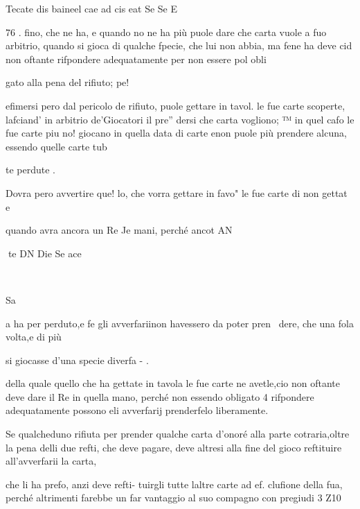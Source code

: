 \documentclass[12pt,a6paper]{article}
\begin{document}
 

Tecate dis baineel cae ad cis eat Se Se E

 

 
 

 

 

 

 

76 .
fino, che ne ha, e quando no
ne ha più puole dare che carta
vuole a fuo arbitrio, quando si
gioca di qualche fpecie, che lui
non abbia, ma fene ha deve cid
non oftante rifpondere adequatamente per non essere pol obli

gato alla pena del rifiuto; pe!

efimersi pero dal pericolo de
rifiuto, puole gettare in tavol.
le fue carte scoperte, lafciand'
in arbitrio de’Giocatori il pre”
dersi che carta vogliono; ™
in quel cafo le fue carte piu no!
giocano in quella data di carte
enon puole più prendere
alcuna, essendo quelle carte tub

te perdute .

Dovra pero avvertire que!
lo, che vorra gettare in favo"
le fue carte di non gettat e

quando avra ancora un Re
Je mani, perché ancot AN

 
te DN Die Se ace

~

Sa

 

 

a
ha per perduto,e fe gli avverfariinon havessero da poter pren~
dere, che una fola volta,e di più

si giocasse d’una specie diverfa - .

della quale quello che ha gettate in tavola le fue carte ne
avetle,cio non oftante deve dare il Re in quella mano, perché
non essendo obligato 4 rifpondere adequatamente possono eli
avverfarij prenderfelo liberamente.

Se qualcheduno rifiuta per
prender qualche carta d’onoré
alla parte cotraria,oltre la pena
delli due refti, che deve pagare,
deve altresi alla fine del gioco
reftituire all’avverfarii la carta,

che li ha prefo, anzi deve refti- 
tuirgli tutte laltre carte ad ef.
clufione della fua, perché altrimenti farebbe un far vantaggio
al suo compagno con pregiudi
3 Z10

 

 

 

 
 
\end{document}

